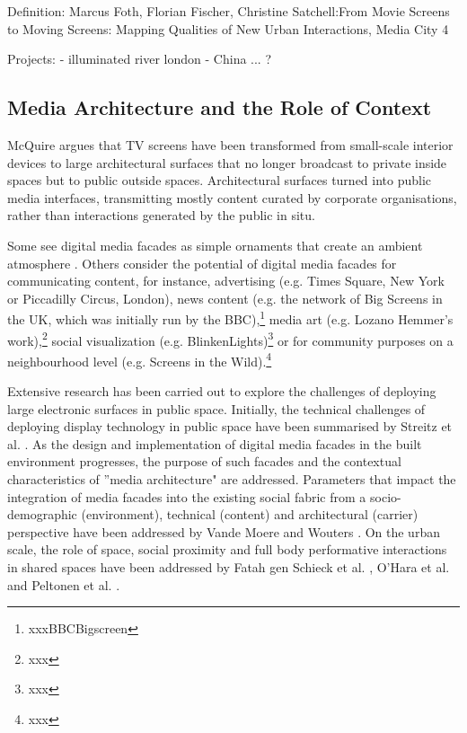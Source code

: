 Definition:
Marcus Foth, Florian Fischer, Christine Satchell:From Movie Screens to Moving Screens: Mapping Qualities of New Urban Interactions, Media City 4

Projects:
- illuminated river london
- China ... ?


\subsection {Media Architecture and the Role of Context}

McQuire \cite{McQuire2006} argues that TV screens have been transformed from small-scale interior devices to large architectural surfaces that no longer broadcast to private inside spaces but to public outside spaces. Architectural surfaces turned into public media interfaces, transmitting mostly content curated by corporate organisations, rather than interactions generated by the public in situ. 

Some see digital media facades as simple ornaments that create an ambient atmosphere \cite{Caspary2009}. 
Others consider the potential of digital media facades for communicating content, for instance, advertising (e.g. Times Square, New York or Piccadilly Circus, London), news content (e.g. the network of Big Screens in the UK, which was initially run by the BBC),\footnote{xxxBBCBigscreen} media art (e.g. Lozano Hemmer’s work),\footnote{xxx} social visualization (e.g. BlinkenLights)\footnote{xxx} or for community purposes on a neighbourhood level (e.g. Screens in the Wild).\footnote{xxx}

Extensive research has been carried out to explore the challenges of deploying large electronic surfaces in public space.
Initially, the technical challenges of deploying display technology in public space have been summarised by Streitz et al. \cite{Streitz2003}. 
As the design and implementation of digital media facades in the built environment progresses, the purpose of such facades and the contextual characteristics of ''media architecture" are addressed. Parameters that impact the integration of media
facades into the existing social fabric from a socio-demographic (environment), technical (content) and architectural (carrier) perspective have been addressed by Vande Moere and Wouters \cite{VandeMoere2012}. On the urban scale, the role of space, social proximity and full body performative interactions in shared spaces have been addressed by Fatah gen Schieck et al. \cite{Fatah2008}, O’Hara et al. \cite{Hara2008} and Peltonen et al. \cite{Peltonen2008}.



